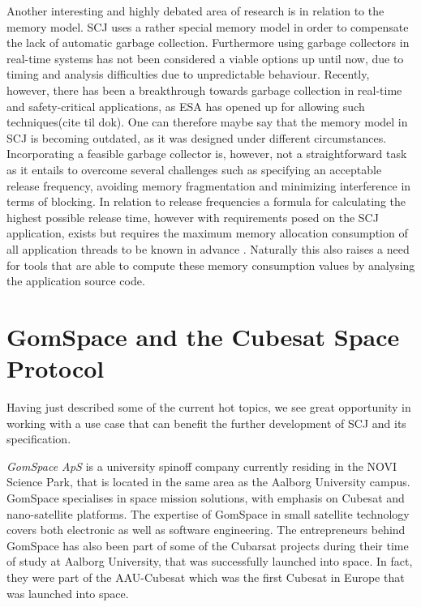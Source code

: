 Another interesting and highly debated area of research is in relation to the memory model. SCJ uses a rather special memory model in order to compensate the lack of automatic garbage collection. Furthermore using garbage collectors in real-time systems has not been considered a viable options up until now, due to timing and analysis difficulties due to unpredictable behaviour. Recently, however, there has been a breakthrough towards garbage collection in real-time and safety-critical applications, as ESA has opened up for allowing such techniques(cite til dok). One can therefore maybe say that the memory model in SCJ is becoming outdated, as it was designed under different circumstances. Incorporating a feasible garbage collector is, however, not a straightforward task as it entails to overcome several challenges such as specifying an acceptable release frequency, avoiding memory fragmentation and minimizing interference in terms of blocking. In relation to release frequencies a formula for calculating the highest possible release time, however with requirements posed on the SCJ application, exists but requires the maximum memory allocation consumption of all application threads to be known in advance \cite{Schoeberl:2007:GCS:1288940.1288953}. Naturally this also raises a need for tools that are able to compute these memory consumption values by analysing the application source code.

\section{GomSpace and the Cubesat Space Protocol} %
\label{sec:gomspace_and_the_cubesat_space_protocol}
Having just described some of the current hot topics, we see great opportunity in working with a use case that can benefit the further development of SCJ and its specification.

\textit{GomSpace ApS} is a university spinoff company currently residing in the NOVI Science Park, that is located in the same area as the Aalborg University campus. GomSpace specialises in space mission solutions, with emphasis on Cubesat and nano-satellite platforms\cite{GomSpace}. The expertise of GomSpace in small satellite technology covers both electronic as well as software engineering. The entrepreneurs behind GomSpace has also been part of some of the Cubarsat projects during their time of study at Aalborg University, that was successfully launched into space. In fact, they were part of the AAU-Cubesat which was the first Cubesat in Europe that was launched into space.

